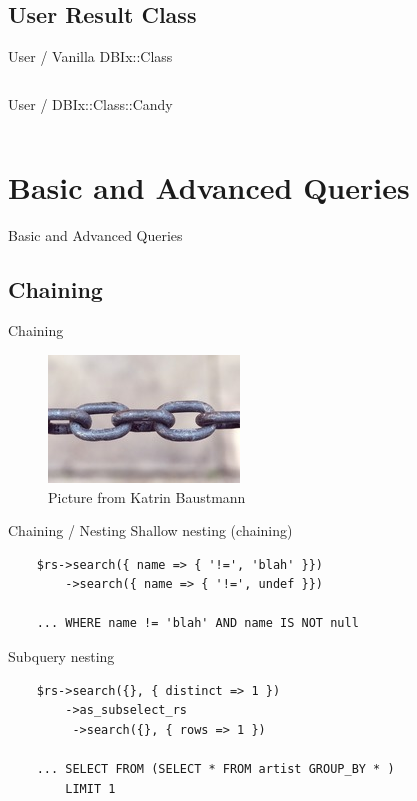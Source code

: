 \subsection{User Result Class}

\begin{frame}[fragile]{User / Vanilla DBIx::Class}
\begin{lstlisting}

\end{lstlisting}
\end{frame}

\begin{frame}[fragile]{User / DBIx::Class::Candy}
\begin{lstlisting}

\end{lstlisting}
\end{frame}

\section{Basic and Advanced Queries}
\begin{frame}{Basic and Advanced Queries}
\end{frame}

\subsection{Chaining}

\begin{frame}{Chaining}
  \begin{figure}[!ht]
    \begin{center}
      \includegraphics{img/chains.jpg}
      \caption[Chains]{Picture from Katrin Baustmann}
    \end{center}
  \end{figure}
\end{frame}


\begin{frame}[fragile]{Chaining / Nesting}
Shallow nesting (chaining)
\begin{lstlisting}
    $rs->search({ name => { '!=', 'blah' }})
        ->search({ name => { '!=', undef }})

    ... WHERE name != 'blah' AND name IS NOT null
\end{lstlisting}
Subquery nesting
\begin{lstlisting}
    $rs->search({}, { distinct => 1 })
        ->as_subselect_rs
         ->search({}, { rows => 1 })

    ... SELECT FROM (SELECT * FROM artist GROUP_BY * )
        LIMIT 1
\end{lstlisting}
\end{frame}

